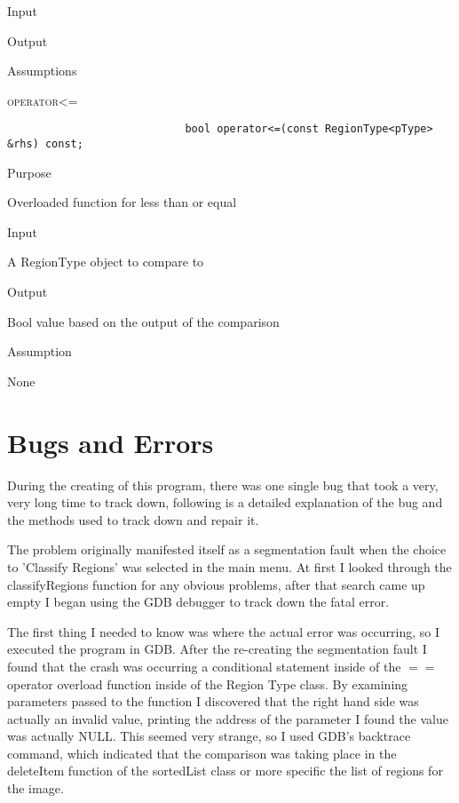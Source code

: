 \documentclass[pdftex, 12pt]{article}
\begin{document}
\begin{description}
\begin{description}
\begin{description}
\begin{description}
					\item{Input}

					\item{Output}

					\item{Assumptions}

				\end{description}

			\item{\textsc{operator<=}}
				\begin{description}
						\begin{lstlisting}
							bool operator<=(const RegionType<pType> &rhs) const;
						\end{lstlisting}

					\item{Purpose}

						Overloaded function for less than or equal

					\item{Input}

						A RegionType object to compare to

					\item{Output}

						Bool value based on the output of the comparison

					\item{Assumption}

						None

				\end{description}
				\section{Bugs and Errors}

				During the creating of this program, there was one single bug that took a very, very long time to track down, following
				is a detailed explanation of the bug and the methods used to track down and repair it.

				The problem originally manifested itself as a segmentation fault when the choice to 'Classify Regions' was selected in
				the main menu.  At first I looked through the classifyRegions function for any obvious problems, after that search came
				up empty I began using the GDB debugger to track down the fatal error.

				The first thing I needed to know was where the actual error was occurring, so I executed the program in GDB.  After the
				re-creating the segmentation fault I found that the crash was occurring a conditional statement inside of the $==$
				operator overload function inside of the Region Type class.  By examining parameters passed to the function I discovered
				that the right hand side was actually an invalid value, printing the address of the parameter I found the value was
				actually NULL.  This seemed very strange, so I used GDB's backtrace command, which indicated that the comparison was
				taking place in the deleteItem function of the sortedList class or more specific the list of regions for the image.


\end{description}
\end{description}
\end{description}
\end{document}
